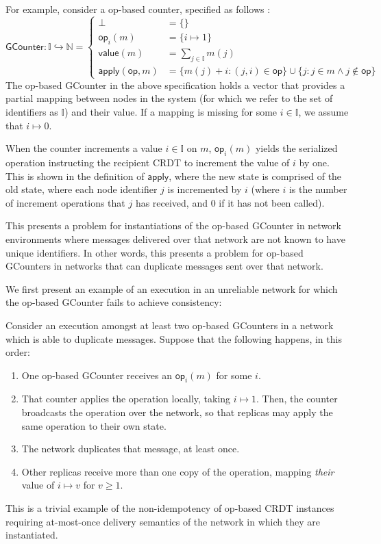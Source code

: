 For example, consider a op-based counter, specified as follows :
\[
\mathsf{GCounter}
  : \mathbb{I} \hookrightarrow \mathbb{N}
  = \left\{
      \begin{aligned}
        \bot &= \{\} \\
        \mathsf{op}_i(m) &= \{ i \mapsto 1 \} \\
        \mathsf{value}(m) &= \sum_{j \in \mathbb{I}} m(j) \\
        \mathsf{apply}(\mathsf{op}, m) &= \{
          m(j) + i : (j, i) \in \mathsf{op}
        \} \cup \{ j : j \in m \land j \notin \mathsf{op} \}
      \end{aligned}
    \right.
\]
The op-based GCounter in the above specification holds a vector that provides a
partial mapping between nodes in the system (for which we refer to the set of
identifiers as $\mathbb{I}$) and their value. If a mapping is missing for some
$i \in \mathbb{I}$, we assume that $i \mapsto 0$.

When the counter increments a value $i \in \mathbb{I}$ on $m$,
$\mathsf{op}_i(m)$ yields the serialized operation instructing the recipient
CRDT to increment the value of $i$ by one. This is shown in the definition of
$\mathsf{apply}$, where the new state is comprised of the old state, where each
node identifier $j$ is incremented by $i$ (where $i$ is the number of increment
operations that $j$ has received, and $0$ if it has not been called).

This presents a problem for instantiations of the op-based GCounter in network
environments where messages delivered over that network are not known to have
unique identifiers. In other words, this presents a problem for op-based
GCounters in networks that can duplicate messages sent over that network.

We first present an example of an execution in an unreliable network for which
the op-based GCounter fails to achieve consistency:
\begin{example}
  Consider an execution amongst at least two op-based GCounters in a network
  which is able to duplicate messages. Suppose that the following happens, in
  this order:
  \begin{enumerate}
    \item One op-based GCounter receives an $\mathsf{op}_i(m)$ for some $i$.
    \item That counter applies the operation locally, taking $i \mapsto 1$. Then,
      the counter broadcasts the operation over the network, so that replicas may
      apply the same operation to their own state.
    \item The network duplicates that message, at least once.
    \item Other replicas receive more than one copy of the operation, mapping
      \textit{their} value of $i \mapsto v$ for $v \ge 1$.
  \end{enumerate}
  This is a trivial example of the non-idempotency of op-based CRDT instances
  requiring at-most-once delivery semantics of the network in which they are
  instantiated.
\end{example}

